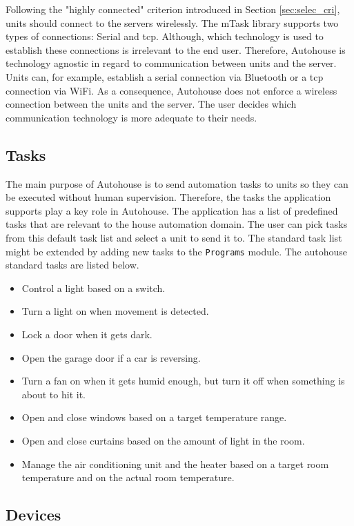 Following the "highly connected" criterion introduced in Section \ref{sec:selec_cri}, units should connect to the servers wirelessly. The \gls{mTask} library supports two types of connections: Serial and \acs{tcp}. Although, which technology is used to establish these connections is irrelevant to the end user. Therefore, Autohouse is technology agnostic in regard to communication between units and the server. Units can, for example, establish a serial connection via Bluetooth or a \acs{tcp} connection via WiFi. As a consequence, Autohouse does not enforce a wireless connection between the units and the server. The user decides which communication technology is more adequate to their needs.

\subsection{Tasks}\label{sec:autohouse_tasks}

The main purpose of Autohouse is to send automation tasks to units so they can be executed without human supervision. Therefore, the tasks the application supports play a key role in Autohouse. The application has a list of predefined tasks that are relevant to the house automation domain. The user can pick tasks from this default task list and select a unit to send it to. The standard task list might be extended by adding new tasks to the \texttt{Programs} module. The \gls{autohouse} standard tasks are listed below.

\begin{itemize}
    \item Control a light based on a switch. 
    \item Turn a light on when movement is detected.
    \item Lock a door when it gets dark.
    \item Open the garage door if a car is reversing.
    \item Turn a fan on when it gets humid enough, but turn it off when something is about to hit it.
    \item Open and close windows based on a target temperature range.
    \item Open and close curtains based on the amount of light in the room.
    \item Manage the air conditioning unit and the heater based on a target room temperature and on the actual room temperature.
\end{itemize}

\subsection{Devices}\label{sec:autohouse_devices}

